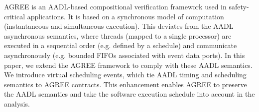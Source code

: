 AGREE is an AADL-based compositional verification framework used in safety-critical applications. It is based on a synchronous model of computation (instantaneous and simultaneous execution). This deviates from the AADL asynchronous semantics, where threads (mapped to a single processor) are executed in a sequential order (e.g. defined by a schedule) and communicate asynchronously (e.g. bounded FIFOs associated with event data ports). In this paper, we extend the AGREE framework to comply with these AADL semantics. We introduce virtual scheduling events, which tie AADL timing and scheduling semantics to AGREE contracts. This enhancement enables AGREE to preserve the AADL semantics and take the software execution schedule into account in the analysis. 
